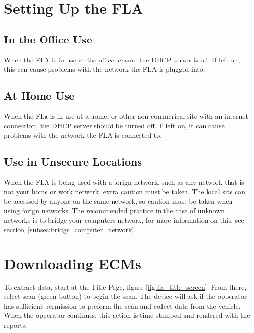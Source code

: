 \documentclass[11pt]{article}
\begin{document}
\section{Setting Up the FLA}
\subsection{In the Office Use}
When the FLA is in use at the office, ensure the DHCP server is off. If left on, this can cause problems with the network the FLA is plugged into.
\subsection{At Home Use}
When the FLa is in use at a home, or other non-commerical site with an internet connection, the DHCP server should be turned off. If left on, it can cause problems with the network the FLA is connected to.
\subsection{Use in Unsecure Locations}
When the FLA is being used with a forign network, such as any network that is not your home or work network, extra caution must be taken. The local site can be accessed by anyone on the same network, so caution must be taken when using forign networks. The recommended practice in the case of unknown networks is to bridge your computers network, for more information on this, see section~\ref{subsec:bridge_computer_network}.
\section{Downloading ECMs}
To extract data, start at the Title Page, figure \ref{fig:fla_title_screen}. From there, select scan (green button) to begin the scan. The device will ask if the opperator has sufficient permission to preform the scan and collect data from the vehicle. When the opperator continues, this action is time-stamped and rendered with the reports.\newline
\end{document}
